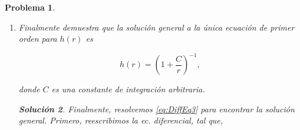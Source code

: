 \documentclass[12pt]{article}
\theoremstyle{break}
\newtheorem{exercise}{Problema}
\theoremstyle{nonumberbreak}
\newtheorem{solution}{Solución}
\begin{document}
\begin{exercise}
\begin{enumerate}[label = \alph*)]
\begin{solution}
          \begin{align*}
            f^{\prime} &= \dfrac{-h^{\prime}}{h^{2}},\\
            f^{\prime\prime} &= \dfrac{-h^{\prime\prime}h^{2} + 2{h^{\prime}}^{2}h}{h^{4}}.
          \end{align*}

          Sustituyendo las derivadas correspondientes en \cref{eq:DiffEq2Reduce1},

          \begin{align}
            -rh\dfrac{{h^{\prime}}^{2}}{h^{4}} + 2r\left(\dfrac{-h^{\prime\prime}h^{2} + 2{h^{\prime}}^{2}h}{h^{4}}\right) - r\left(\dfrac{-h^{\prime}}{h^{2}}\right)\left(\dfrac{1}{h}\right)h^{\prime} - 2\left(\dfrac{1}{h^{2}}\right)h^{\prime} &= 0,\nonumber\\
            \dfrac{rh^{\prime\prime}h^{2} - 2r{h^{\prime}}^{2}h + 2h^{\prime}h^{2}}{h^{4}} &= 0,\nonumber\\
            \Aboxed{h(r)(rh^{\prime\prime}(r) + 2h^{\prime}(r)) - 2rh^{\prime}(r)^{2} &= 0.}\label{eq:DiffEq4}
          \end{align}

          Derivando \cref{eq:DiffEq2} respecto a \(r\),

          \begin{align*}
            \odv[fun=true]{rh^{\prime} + h^{2} - h}{r} &= h^{\prime} + rh^{\prime\prime} + 2hh^{\prime} - h^{\prime},\\
            &= rh^{\prime\prime} + 2h(r)h^{\prime}.
          \end{align*}

          Puesto que la expresión anterior aparece en \cref{eq:DiffEq4}, podemos concluir que no son independientes, ya que \cref{eq:DiffEq4} se puede escribir como combinación lineal de \cref{eq:DiffEq2}.
        \end{solution}
        
        \item Finalmente demuestra que la solución general a la única ecuación de primer orden para \(h(r)\) es
        
        \begin{equation}
          h(r) = \left(1 + \dfrac{C}{r}\right)^{-1},
        \end{equation}

        donde \(C\) es una constante de integración arbitraria.

        \begin{solution}
          Finalmente, resolvemos \cref{eq:DiffEq3} para encontrar la solución general. Primero, reescribimos la ec. diferencial, tal que,


\end{solution}
\end{enumerate}
\end{exercise}
\end{document}

